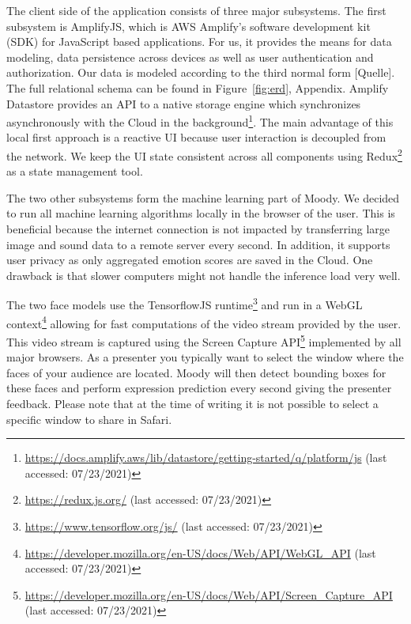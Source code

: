 The client side of the application consists of three major subsystems. The first subsystem is AmplifyJS, which is AWS Amplify's software development kit (SDK) for JavaScript based applications. For us, it provides the means for data modeling, data persistence across devices as well as user authentication and authorization. Our data is modeled according to the third normal form [Quelle]. The full relational schema can be found in Figure~\ref{fig:erd}, Appendix. Amplify Datastore provides an API to a native storage engine which synchronizes asynchronously with the Cloud in the background\footnote{\url{https://docs.amplify.aws/lib/datastore/getting-started/q/platform/js} (last accessed: 07/23/2021)}. The main advantage of this local first approach is a reactive UI because user interaction is decoupled from the network. We keep the UI state consistent across all components using Redux\footnote{\url{https://redux.js.org/} (last accessed: 07/23/2021)} as a state management tool.

The two other subsystems form the machine learning part of Moody. We decided to run all machine learning algorithms locally in the browser of the user. This is beneficial because the internet connection is not impacted by transferring large image and sound data to a remote server every second. In addition, it supports user privacy as only aggregated emotion scores are saved in the Cloud. One drawback is that slower computers might not handle the inference load very well.

The two face models use the TensorflowJS runtime\footnote{\url{https://www.tensorflow.org/js/} (last accessed: 07/23/2021)} and run in a WebGL context\footnote{\url{https://developer.mozilla.org/en-US/docs/Web/API/WebGL_API} (last accessed: 07/23/2021)} allowing for fast computations of the video stream provided by the user. This video stream is captured using the Screen Capture API\footnote{\url{https://developer.mozilla.org/en-US/docs/Web/API/Screen_Capture_API} (last accessed: 07/23/2021)} implemented by all major browsers. As a presenter you typically want to select the window where the faces of your audience are located. Moody will then detect bounding boxes for these faces and perform expression prediction every second giving the presenter feedback. Please note that at the time of writing it is not possible to select a specific window to share in Safari.

